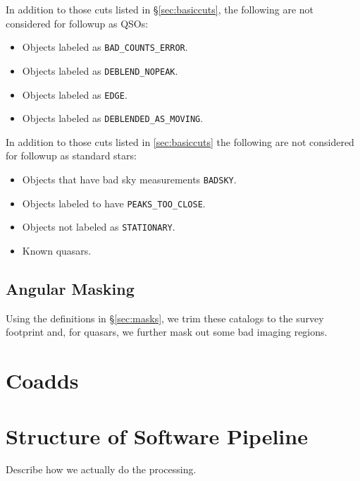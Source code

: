 \documentclass[12pt,preprint]{aastex}
\begin{document}
In addition to those cuts listed in \S \ref{sec:basiccuts}, the following are
not considered for followup as QSOs:

\begin{itemize}

    \item Objects labeled as \texttt{BAD\_COUNTS\_ERROR}.
    \item Objects labeled as \texttt{DEBLEND\_NOPEAK}.
    \item Objects labeled as \texttt{EDGE}.
    \item Objects labeled as \texttt{DEBLENDED\_AS\_MOVING}.

\end{itemize}


 \label{sec:cutstd}

In addition to those cuts listed in \ref{sec:basiccuts} the following are not
considered for followup as standard stars:

\begin{itemize}

    \item Objects that have bad sky measurements \texttt{BADSKY}.
    \item Objects labeled to have \texttt{PEAKS\_TOO\_CLOSE}.
    \item Objects not labeled as \texttt{STATIONARY}.
    \item Known quasars.
   
\end{itemize}



\subsection{Angular Masking}

Using the definitions in \S \ref{sec:masks}, we trim these catalogs to the
survey footprint and, for quasars, we further mask out some bad imaging
regions.

\section{Coadds}

\section{Structure of Software Pipeline} \label{sec:structure}

Describe how we actually do the processing.
\end{document}
